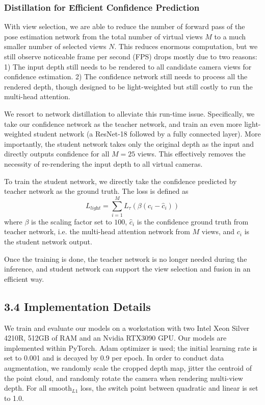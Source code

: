 \documentclass[letterpaper]{article} \usepackage{aaai22}  \usepackage{times}  \usepackage{helvet}  \usepackage{courier}  \usepackage[hyphens]{url}  \usepackage{graphicx} \urlstyle{rm} \def\UrlFont{\rm}  \usepackage{natbib}  \usepackage{caption} \DeclareCaptionStyle{ruled}{labelfont=normalfont,labelsep=colon,strut=off} \frenchspacing  \setlength{\pdfpagewidth}{8.5in}  \setlength{\pdfpageheight}{11in}  \usepackage{algorithm}
\begin{document}
\subsubsection{Distillation for Efficient Confidence Prediction}
With view selection, we are able to reduce the number of forward pass of the pose estimation network from the total number of virtual views $M$ to a much smaller number of selected views $N$.
This reduces enormous computation, but we still observe noticeable frame per second (FPS) drops mostly due to two reasons: 1) The input depth still needs to be rendered to all candidate camera views for confidence estimation. 2) The confidence network still needs to process all the rendered depth, though designed to be light-weighted but still costly to run the multi-head attention.

We resort to network distillation to alleviate this run-time issue.
Specifically, we take our confidence network as the teacher network, and train an even more light-weighted student network (a ResNet-18 followed by a fully connected layer).
More importantly, the student network takes only the original depth as the input and directly outputs confidence for all $M=25$ views.
This effectively removes the necessity of re-rendering the input depth to all virtual cameras.

To train the student network, we directly take the confidence predicted by teacher network as the ground truth.
The loss is defined as 
\begin{equation}
\label{eq:light_loss}
L_{\textit{light}} = \sum_{i = 1}^M L_{\tau}(\beta (c_{i} - {\hat{c}}_{i} ) )
\end{equation}
where $\beta$ is the scaling factor set to $100$, ${\hat{c}}_{i} $ is the confidence ground truth from teacher network, i.e. the multi-head attention network from $M$ views, and $c_{i}$ is the student network output.

Once the training is done, the teacher network is no longer needed during the inference, and student network can support the view selection and fusion in an efficient way.

\subsection{3.4 Implementation Details}
We train and evaluate our models on a workstation with two Intel Xeon Silver 4210R, 512GB of RAM and an Nvidia RTX3090 GPU. Our models are implemented within PyTorch. Adam optimizer is used; the initial learning rate is set to 0.001 and is decayed by 0.9 per epoch.  In order to conduct data augmentation, we randomly scale the cropped depth map, jitter the centroid of the point cloud, and randomly rotate the camera when rendering multi-view depth. For all smooth$_{L1}$ loss, the switch point between quadratic and linear is set to 1.0.
\end{document}
